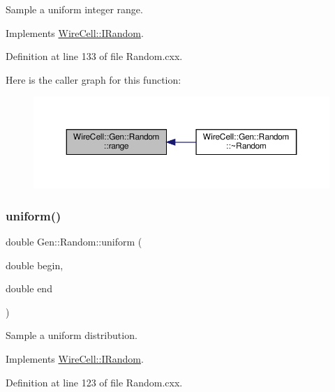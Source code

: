 Sample a uniform integer range. 



Implements \hyperlink{class_wire_cell_1_1_i_random_a936f25425285556c6be01e4e73ea27fd}{Wire\+Cell\+::\+I\+Random}.



Definition at line 133 of file Random.\+cxx.

Here is the caller graph for this function\+:
\nopagebreak
\begin{figure}[H]
\begin{center}
\leavevmode
\includegraphics[width=350pt]{class_wire_cell_1_1_gen_1_1_random_a84b86a3aaa791e75eb3eb80e1efb1d7e_icgraph}
\end{center}
\end{figure}
\mbox{\label{class_wire_cell_1_1_gen_1_1_random_aa470ac91289961da741d0d31ccfb83d8}} 
\subsubsection{\texorpdfstring{uniform()}{uniform()}}
{\footnotesize\ttfamily double Gen\+::\+Random\+::uniform (\begin{DoxyParamCaption}\item[{double}]{begin,  }\item[{double}]{end }\end{DoxyParamCaption})\hspace{0.3cm}{\ttfamily [virtual]}}



Sample a uniform distribution. 



Implements \hyperlink{class_wire_cell_1_1_i_random_ac110a2703fe22175c8c074a55a0218a3}{Wire\+Cell\+::\+I\+Random}.



Definition at line 123 of file Random.\+cxx.

